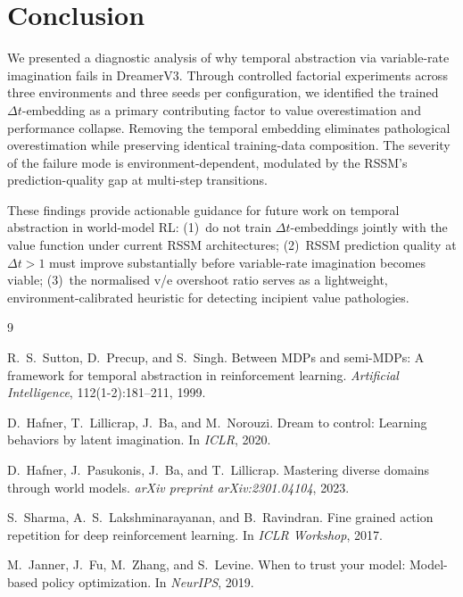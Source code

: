 \documentclass[letterpaper]{article}
\begin{document}
\section{Conclusion}

We presented a diagnostic analysis of why temporal abstraction via variable-rate imagination fails in DreamerV3.
Through controlled factorial experiments across three environments and three seeds per configuration, we identified the trained $\Delta t$-embedding as a primary contributing factor to value overestimation and performance collapse.
Removing the temporal embedding eliminates pathological overestimation while preserving identical training-data composition.
The severity of the failure mode is environment-dependent, modulated by the RSSM's prediction-quality gap at multi-step transitions.

These findings provide actionable guidance for future work on temporal abstraction in world-model RL:
(1)~do not train $\Delta t$-embeddings jointly with the value function under current RSSM architectures;
(2)~RSSM prediction quality at $\Delta t{>}1$ must improve substantially before variable-rate imagination becomes viable;
(3)~the normalised v/e overshoot ratio serves as a lightweight, environment-calibrated heuristic for detecting incipient value pathologies.


\begin{thebibliography}{9}

R.~S.~Sutton, D.~Precup, and S.~Singh.
\newblock Between MDPs and semi-MDPs: A framework for temporal abstraction in reinforcement learning.
\newblock \emph{Artificial Intelligence}, 112(1-2):181--211, 1999.

D.~Hafner, T.~Lillicrap, J.~Ba, and M.~Norouzi.
\newblock Dream to control: Learning behaviors by latent imagination.
\newblock In \emph{ICLR}, 2020.

D.~Hafner, J.~Pasukonis, J.~Ba, and T.~Lillicrap.
\newblock Mastering diverse domains through world models.
\newblock \emph{arXiv preprint arXiv:2301.04104}, 2023.

S.~Sharma, A.~S.~Lakshminarayanan, and B.~Ravindran.
\newblock Fine grained action repetition for deep reinforcement learning.
\newblock In \emph{ICLR Workshop}, 2017.

M.~Janner, J.~Fu, M.~Zhang, and S.~Levine.
\newblock When to trust your model: Model-based policy optimization.
\newblock In \emph{NeurIPS}, 2019.

\end{thebibliography}
\end{document}
